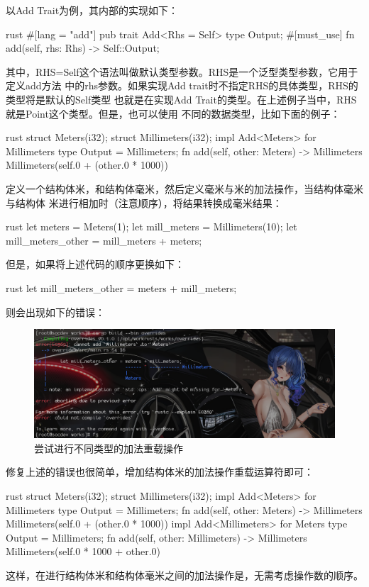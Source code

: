以Add Trait为例，其内部的实现如下：
\begin{code-block}{rust}
#[lang = "add"]
pub trait Add<Rhs = Self> {
    type Output;
    #[must_use]
    fn add(self, rhs: Rhs) -> Self::Output;
}
\end{code-block}
其中，RHS=Self这个语法叫做默认类型参数。RHS是一个泛型类型参数，它用于定义add方法
中的rhs参数。如果实现Add trait时不指定RHS的具体类型，RHS的类型将是默认的Self类型
也就是在实现Add Trait的类型。在上述例子当中，RHS就是Point这个类型。但是，也可以使用
不同的数据类型，比如下面的例子：
\begin{code-block}{rust}
struct Meters(i32);
struct Millimeters(i32);
impl Add<Meters> for Millimeters {
    type Output = Millimeters;
    fn add(self, other: Meters) -> Millimeters {
        Millimeters(self.0 + (other.0 * 1000))
    }
}
\end{code-block}
定义一个结构体米，和结构体毫米，然后定义毫米与米的加法操作，当结构体毫米与结构体
米进行相加时（注意顺序），将结果转换成毫米结果：
\begin{code-block}{rust}
let meters = Meters(1);
let mill_meters = Millimeters(10);
let mill_meters_other = mill_meters + meters;
\end{code-block}
但是，如果将上述代码的顺序更换如下：
\begin{code-block}{rust}
let mill_meters_other = meters + mill_meters;
\end{code-block}
则会出现如下的错误：
\begin{figure}[H]
  \centering
  \includegraphics[width=\linewidth]{rust_override_error.png}
  \caption{尝试进行不同类型的加法重载操作}
  \label{fig:rust_override_error}
\end{figure}
修复上述的错误也很简单，增加结构体米的加法操作重载运算符即可：
\begin{code-block}{rust}
struct Meters(i32);
struct Millimeters(i32);
impl Add<Meters> for Millimeters {
    type Output = Millimeters;
    fn add(self, other: Meters) -> Millimeters {
        Millimeters(self.0 + (other.0 * 1000))
    }
}
impl Add<Millimeters> for Meters {
    type Output = Millimeters;
    fn add(self, other: Millimeters) -> Millimeters {
        Millimeters(self.0 * 1000 + other.0)
    }
}
\end{code-block}
这样，在进行结构体米和结构体毫米之间的加法操作是，无需考虑操作数的顺序。

